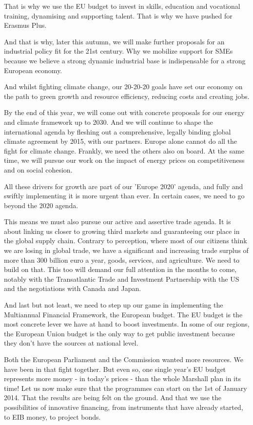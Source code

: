 \documentclass[a4paper,11pt]{article}
\begin{document}
That is why we use the EU budget to invest in skills, education and vocational training, dynamising and supporting talent. That is why we have pushed for Erasmus Plus.

And that is why, later this autumn, we will make further proposals for an industrial policy fit for the 21st century. Why we mobilize support for SMEs because we believe a strong dynamic industrial base is indispensable for a strong European economy.

And whilst fighting climate change, our 20-20-20 goals have set our economy on the path to green growth and resource efficiency, reducing costs and creating jobs.

By the end of this year, we will come out with concrete proposals for our energy and climate framework up to 2030. And we will continue to shape the international agenda by fleshing out a comprehensive, legally binding global climate agreement by 2015, with our partners. Europe alone cannot do all the fight for climate change. Frankly, we need the others also on board. At the same time, we will pursue our work on the impact of energy prices on competitiveness and on social cohesion.

All these drivers for growth are part of our 'Europe 2020' agenda, and fully and swiftly implementing it is more urgent than ever. In certain cases, we need to go beyond the 2020 agenda.

This means we must also pursue our active and assertive trade agenda. It is about linking us closer to growing third markets and guaranteeing our place in the global supply chain. Contrary to perception, where most of our citizens think we are losing in global trade, we have a significant and increasing trade surplus of more than 300 billion euro a year, goods, services, and agriculture. We need to build on that. This too will demand our full attention in the months to come, notably with the Transatlantic Trade and Investment Partnership with the US and the negotiations with Canada and Japan.

And last but not least, we need to step up our game in implementing the Multiannual Financial Framework, the European budget. The EU budget is the most concrete lever we have at hand to boost investments. In some of our regions, the European Union budget is the only way to get public investment because they don't have the sources at national level.

Both the European Parliament and the Commission wanted more resources. We have been in that fight together. But even so, one single year's EU budget represents more money - in today's prices - than the whole Marshall plan in its time! Let us now make sure that the programmes can start on the 1st of January 2014. That the results are being felt on the ground. And that we use the possibilities of innovative financing, from instruments that have already started, to EIB money, to project bonds.
\end{document}
